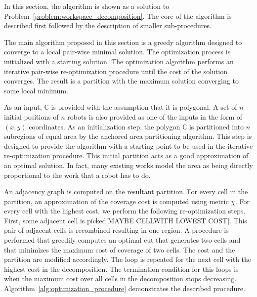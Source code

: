 \documentclass[../main.tex]{subfiles}
\begin{document}
In this section, the algorithm is shown as a solution to Problem~\ref{problem:workspace_decomposition}. The core of the algorithm is described first followed by the description of smaller sub-procedures.

The main algorithm proposed in this section is a greedy algorithm designed to converge to a local pair-wise minimal solution. The optimization process is initialized with a starting solution. The optimization algorithm performs an iterative pair-wise re-optimization procedure until the cost of the solution converges. The result is a partition with the maximum solution converging to some local minimum.

As an input, $\mathbb{C}$ is provided with the assumption that it is polygonal. A set of $n$ initial positions of $n$ robots is also provided as one of the inputs in the form of $(x,y)$ coordinates. As an initialization step, the polygon $\mathbb{C}$ is partitioned into $n$ subregions of equal area by the anchored area partitioning algorithm. This step is designed to provide the algorithm  with a starting point to be used in the iterative re-optimization procedure. This initial partition acts as a good approximation of an optimal solution. In fact, many existing works model the area as being directly proportional to the work that a robot has to do.

An adjacency graph is computed on the resultant partition. For every cell in the partition, an approximation of the coverage cost is computed using metric $\chi$. For every cell with the highest cost, we perform the following re-optimization steps. First, some adjacent cell is picked[MAYBE CELLWITH LOWEST COST]. This pair of adjacent cells is recombined resulting in one region. A procedure is performed that greedily computes an optimal cut that generates two cells and that minimizes the maximum cost of coverage of two cells. The cost and the partition are modified accordingly. The loop is repeated for the next cell with the highest cost in the decomposition. The termination condition for this loops is when the maximum cost over all cells in the decomposition stops decreasing. Algorithm~\ref{alg:optimization_procedure} demonstrates the described procedure.
\end{document}
